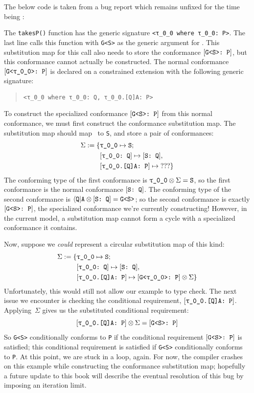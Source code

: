 \documentclass[../generics]{subfiles}
\begin{document}
\begin{example}
The below code is taken from a bug report which remains unfixed for the time being \cite{sr6724}:

The \texttt{takesP()} function has the generic signature \verb|<τ_0_0 where τ_0_0: P>|. The last line calls this function with \texttt{G<S>} as the generic argument for \rT. This substitution map for this call also needs to store the conformance $[\texttt{G<S>:~P}]$, but this conformance cannot actually be constructed. The normal conformance $\ConfReq{G<\rT>}{P}$ is declared on a constrained extension with the following generic signature:
\begin{quote}
\begin{verbatim}
<τ_0_0 where τ_0_0: Q, τ_0_0.[Q]A: P>
\end{verbatim}
\end{quote}
To construct the specialized conformance $[\texttt{G<S>:~P}]$ from this normal conformance, we must first construct the conformance substitution map. The substitution map should map \rT\ to \texttt{S}, and store a pair of conformances:
\begin{align*}
\Sigma := \SubstMapC{
&\SubstType{\rT}{S}}{
\\
&\SubstConf{\rT}{S}{Q},\\
&\ConfReq{\rT.[Q]A}{P}\mapsto\text{???}
}
\end{align*}
The conforming type of the first conformance is $\rT\otimes\Sigma=\texttt{S}$, so the first conformance is the normal conformance $[\texttt{S:~Q}]$. The conforming type of the second conformance is
$\langle\texttt{Q}|\texttt{A}\otimes[\texttt{S:~Q}]=\texttt{G<S>}$; so the second conformance is exactly $[\texttt{G<S>:~P}]$, the specialized conformance we're currently constructing! However, in the current model, a substitution map cannot form a cycle with a specialized conformance it contains.

Now, suppose we \emph{could} represent a circular substitution map of this kind:
\begin{align*}
\Sigma := \SubstMapC{&\SubstType{\rT}{S}}{
\\
&\SubstConf{\rT}{S}{Q},\\
&\ConfReq{\rT.[Q]A}{P}\mapsto\ConfReq{G<\rT>}{P}\otimes\Sigma
}
\end{align*}
Unfortunately, this would still not allow our example to type check. The next issue we encounter is checking the conditional requirement, $\ConfReq{\rT.[Q]A}{P}$. Applying~$\Sigma$ gives us the substituted conditional requirement:
\[\ConfReq{\rT.[Q]A}{P}\otimes\Sigma=\ConfReq{G<S>}{P}\]
So \texttt{G<S>} conditionally conforms to \texttt{P} if the conditional requirement $[\texttt{G<S>:~P}]$ is satisfied; this conditional requirement is satisfied if \texttt{G<S>} conditionally conforms to \texttt{P}. At this point, we are stuck in a loop, again. For now, the compiler crashes on this example while constructing the conformance substitution map; hopefully a future update to this book will describe the eventual resolution of this bug by imposing an iteration limit.
\end{example}
\end{document}
